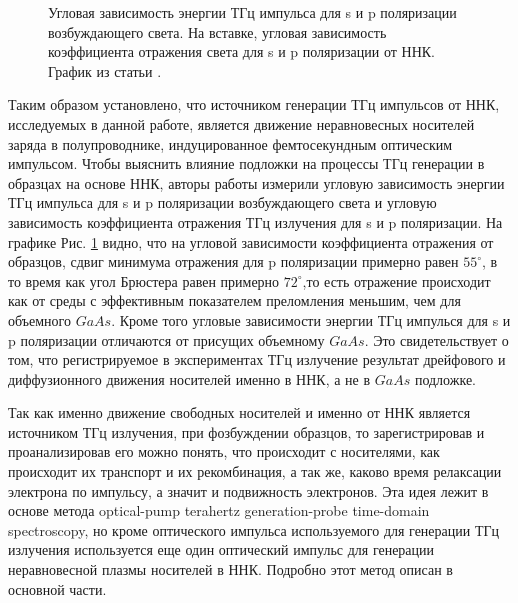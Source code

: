 \documentclass[a4paper,14pt,russian]{extreport}
\begin{document}
				\begin{figure}[h]
					\caption{Угловая зависимость энергии ТГц импульса для s и p поляризации возбуждающего света. На вставке, угловая зависимость коэффициента отражения света для s и p поляризации от ННК. График из статьи \cite{THzGeneration}.}
				\label{ris:ReflectiveNNW}
				\end{figure}
				Таким образом установлено, что источником генерации ТГц импульсов от ННК, исследуемых в данной работе, является движение неравновесных носителей заряда в полупроводнике, индуцированное фемтосекундным оптическим импульсом. Чтобы выяснить влияние подложки на процессы ТГц генерации в образцах на основе ННК, авторы работы измерили угловую зависимость энергии ТГц импульса для s и p поляризации возбуждающего света и угловую зависимость коэффициента отражения ТГц излучения для s и p поляризации. На графике Рис. \ref{ris:ReflectiveNNW} видно, что на угловой зависимости коэффициента отражения от образцов, сдвиг минимума отражения для p поляризации примерно равен $55^{\circ}$, в то время как угол Брюстера равен примерно $72^{\circ}$,то есть отражение происходит как от среды с эффективным показателем преломления меньшим, чем для объемного $GaAs$. Кроме того угловые зависимости энергии ТГц импулься для s и p поляризации отличаются от присущих объемному $GaAs$. Это свидетельствует о том, что регистрируемое в экспериментах ТГц излучение результат дрейфового и диффузионного движения носителей именно в ННК, а не в $GaAs$ подложке.\par
				Так как именно движение свободных носителей и именно от ННК является источником ТГц излучения, при фозбуждении образцов, то зарегистрировав и проанализировав его можно понять, что происходит с носителями, как происходит их транспорт и их рекомбинация, а так же, каково время релаксации электрона по импульсу, а значит и подвижность электронов. Эта идея лежит в основе метода optical-pump terahertz generation-probe time-domain spectroscopy, но кроме оптического импульса используемого для генерации ТГц излучения используется еще один оптический импульс для генерации неравновесной плазмы носителей в ННК. Подробно этот метод описан в основной части.
\end{document}
